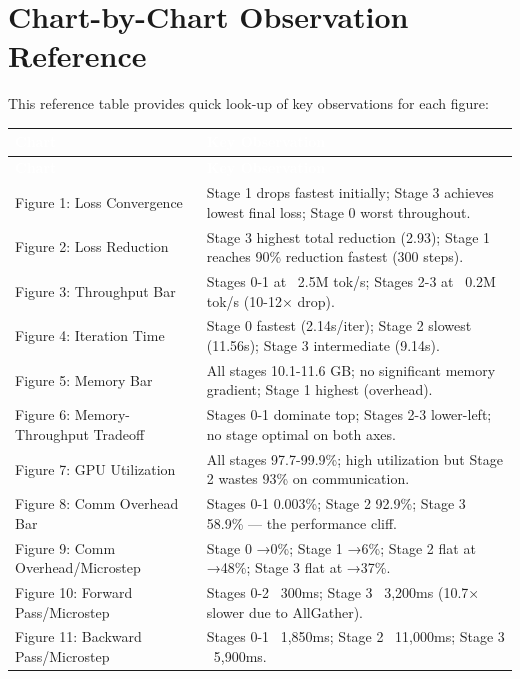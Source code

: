 {\appendix
\section{Chart-by-Chart Observation Reference}

This reference table provides quick look-up of key observations for each figure:

\renewcommand{\arraystretch}{1.3}
\begin{longtable}{L{3.5cm} L{10.5cm}}
\toprule
{}
\textcolor{white}{\textbf{Chart}} & \textcolor{white}{\textbf{Key Observation}} \\
\midrule
\endfirsthead
\toprule
{}
\textcolor{white}{\textbf{Chart}} & \textcolor{white}{\textbf{Key Observation}} \\
\midrule
\endhead
\bottomrule
\endfoot
{}
Figure 1: Loss Convergence & Stage 1 drops fastest initially; Stage 3 achieves lowest final loss; Stage 0 worst throughout. \\
Figure 2: Loss Reduction & Stage 3 highest total reduction (2.93); Stage 1 reaches 90\% reduction fastest (300 steps). \\
Figure 3: Throughput Bar & Stages 0-1 at ~2.5M tok/s; Stages 2-3 at ~0.2M tok/s (10-12× drop). \\
Figure 4: Iteration Time & Stage 0 fastest (2.14s/iter); Stage 2 slowest (11.56s); Stage 3 intermediate (9.14s). \\
Figure 5: Memory Bar & All stages 10.1-11.6 GB; no significant memory gradient; Stage 1 highest (overhead). \\
Figure 6: Memory-Throughput Tradeoff & Stages 0-1 dominate top; Stages 2-3 lower-left; no stage optimal on both axes. \\
Figure 7: GPU Utilization & All stages 97.7-99.9\%; high utilization but Stage 2 wastes 93\% on communication. \\
Figure 8: Comm Overhead Bar & Stages 0-1 0.003\%; Stage 2 92.9\%; Stage 3 58.9\% — the performance cliff. \\
Figure 9: Comm Overhead/Microstep & Stage 0 →0\%; Stage 1 →6\%; Stage 2 flat at →48\%; Stage 3 flat at →37\%. \\
Figure 10: Forward Pass/Microstep & Stages 0-2 ~300ms; Stage 3 ~3,200ms (10.7× slower due to AllGather). \\
Figure 11: Backward Pass/Microstep & Stages 0-1 ~1,850ms; Stage 2 ~11,000ms; Stage 3 ~5,900ms. \\

\end{longtable}}

